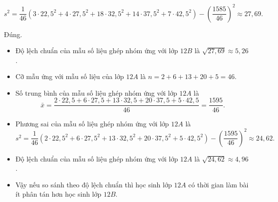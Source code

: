 \begin{ex}
{\begin{itemchoice}
\begin{itemize}
  $$
  s^2=\dfrac{1}{46}\left(3\cdot 22{,}5^2+4\cdot 27{,}5^2+18\cdot 32{,}5^2+14\cdot 37{,}5^2+7\cdot 42{,}5^2\right)-\left(\dfrac{1585}{46}\right)^2 \approx 27{,}69.
  $$
  \end{itemize}		
\itemch Đúng.
\begin{itemize}
	\item  Độ lệch chuẩn của mẫu số liệu ghép nhóm ứng với lớp $12B$ là $\sqrt{27{,}69} \approx 5{,}26$.
	\item Cỡ mẫu ứng với mẫu số liệu của lớp $12A$ là $n=2+6+13+20+5=46$.
		\item	Số trung bình của mẫu số liệu ghép nhóm ứng với lớp $12A$ là
	$$
	\bar{x}=\dfrac{2 \cdot 22{,}5+6\cdot 27{,}5+13\cdot 32{,}5+20\cdot 37{,}5+5\cdot 42{,}5}{46}=\dfrac{1595}{46}.
	$$
		\item	Phương sai của mẫu số liệu ghép nhóm ứng với lớp $12A$ là
		$$
	s^2=\dfrac{1}{46}\left(2\cdot 22{,}5^2+6\cdot 27{,}5^2+13\cdot 32{,}5^2+20\cdot 37{,}5^2+5\cdot 42{,}5^2\right)-\left(\dfrac{1595}{46}\right)^2 \approx 24{,}62.
	$$
		\item 	Độ lệch chuẩn của mẫu số liệu ghép nhóm ứng với lớp $12A$ là $\sqrt{24,62} \approx 4{,}96$.
		\item Vậy nếu so sánh theo độ lệch chuẩn thì học sinh lớp $12A$ có thời gian làm bài ít phân tán hơn học sinh lớp $12B$.
\end{itemize}
\end{itemchoice}
	}
\end{ex}

